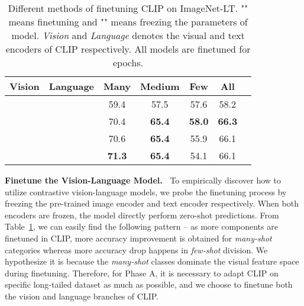 \documentclass[10pt,twocolumn,letterpaper]{article}
\begin{document}
\begin{table}[t!]
    \centering
    \small
\begin{tabular}{lllllll}
    \toprule
         \multicolumn{1}{c|}{Vision}  &\multicolumn{1}{c|}{Language} &\multicolumn{1}{c}{Many} &\multicolumn{1}{c}{Medium} &\multicolumn{1}{c}{Few} &\multicolumn{1}{c}{All}\\ \midrule
         \multicolumn{1}{c|}{}  &\multicolumn{1}{c|}{} &\multicolumn{1}{c}{59.4} &\multicolumn{1}{c}{57.5} &\multicolumn{1}{c}{57.6} &\multicolumn{1}{c}{58.2}\\
         \multicolumn{1}{c|}{}  &\multicolumn{1}{c|}{} &\multicolumn{1}{c}{70.4} &\multicolumn{1}{c}{\bf 65.4} &\multicolumn{1}{c}{\bf 58.0} &\multicolumn{1}{c}{\textbf{66.3}}\\
         \multicolumn{1}{c|}{}  &\multicolumn{1}{c|}{} &\multicolumn{1}{c}{70.6} &\multicolumn{1}{c}{\bf 65.4} &\multicolumn{1}{c}{55.9} &\multicolumn{1}{c}{66.1}\\ 
         \multicolumn{1}{c|}{}  &\multicolumn{1}{c|}{} &\multicolumn{1}{c}{\bf 71.3} &\multicolumn{1}{c}{\bf 65.4} &\multicolumn{1}{c}{54.1} &\multicolumn{1}{c}{66.1}\\ 
    \bottomrule
    \end{tabular}
    \caption{Different methods of finetuning CLIP on ImageNet-LT. "" means finetuning and "" means freezing the parameters of model. \textit{Vision} and \textit{Language} denotes the visual and text encoders of CLIP respectively. All models are finetuned for  epochs.}
    \label{tab:finetune}
    \vspace{-13pt}
\end{table}

\noindent\textbf{Finetune the Vision-Language Model.~}
To empirically discover how to utilize contrastive vision-language models, we probe the finetuning process by freezing the pre-trained image encoder and text encoder respectively. When both encoders are frozen, the model directly perform zero-shot predictions.
From Table~\ref{tab:finetune}, we can easily find the following pattern -- as more components are finetuned in CLIP, more accuracy improvement is obtained for \textit{many-shot} categories whereas more accuracy drop happens in \textit{few-shot} division. We hypothesize it is because the \textit{many-shot} classes dominate the visual feature space during finetuning. Therefore, for Phase A, it is necessary to adapt CLIP on specific long-tailed dataset as much as possible, and we choose to finetune both the vision and language branches of CLIP.
\end{document}
